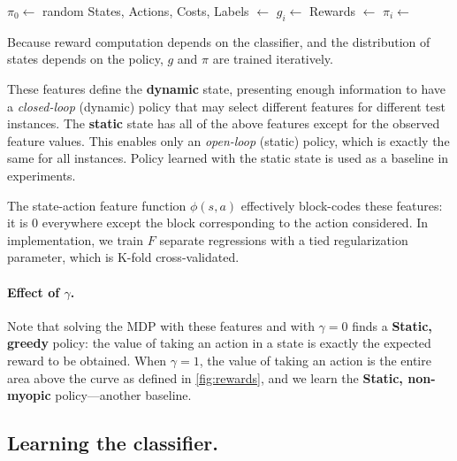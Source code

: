 \begin{algorithm}[]

\SetAlgoLined
{}
\BlankLine
$\pi_0 \leftarrow$ random\;
 {
    States, Actions, Costs, Labels $\leftarrow$ \;
    $g_i \leftarrow$ \;
    Rewards $\leftarrow$ \;
    $\pi_i \leftarrow$ \;
}
\caption{Because reward computation depends on the classifier, and the distribution of states depends on the policy, $g$ and $\pi$ are trained iteratively.\label{alg:learning}}
\end{algorithm}

These features define the \textbf{dynamic} state, presenting enough information to have a \emph{closed-loop} (dynamic) policy that may select different features for different test instances.
The \textbf{static} state has all of the above features except for the observed feature values.
This enables only an \emph{open-loop} (static) policy, which is exactly the same for all instances.
Policy learned with the static state is used as a baseline in experiments.

The state-action feature function $\phi(s, a)$ effectively block-codes these features: it is $0$ everywhere except the block corresponding to the action considered.
In implementation, we train $F$ separate regressions with a tied regularization parameter, which is K-fold cross-validated.

\paragraph{Effect of $\gamma$.}
Note that solving the MDP with these features and with $\gamma=0$ finds a \textbf{Static, greedy} policy: the value of taking an action in a state is exactly the expected reward to be obtained.
When $\gamma=1$, the value of taking an action is the entire area above the curve as defined in \autoref{fig:rewards}, and we learn the \textbf{Static, non-myopic} policy---another baseline.

\subsection{Learning the classifier.}\label{sec:classifier}

